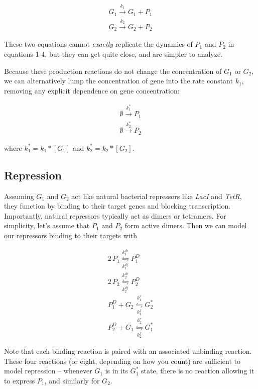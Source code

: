 \documentclass[preprint,12pt]{elsarticle}
\begin{document}
\begin{align}
	G_1 \xrightarrow{k_1} G_1 + P_1\\
	G_2 \xrightarrow{k_2} G_2 + P_2
\end{align}

These two equations cannot \emph{exactly} replicate the dynamics of $P_1$ and $P_2$ in equations 1-4, but they can get quite close, and are simpler to analyze. 

Because these production reactions do not change the concentration of $G_1$ or $G_2$, we can alternatively lump the concentration of gene into the rate constant $k_1$, removing any explicit dependence on gene concentration:

\begin{align}
	\emptyset \xrightarrow{k_1^*} P_1\\
	\emptyset \xrightarrow{k_2^*} P_2
\end{align}

where $k_1^* = k_1*[G_1]$ and $k_2^* = k_2*[G_2]$.

\subsection{Repression}\label{ss:repression}

Assuming $G_1$ and $G_2$ act like natural bacterial repressors like \emph{LacI} and \emph{TetR}, they function by binding to their target genes and blocking transcription. Importantly, natural repressors typically act as dimers or tetramers. For simplicity, let's assume that $P_1$ and $P_2$ form active dimers. Then we can model our repressors binding to their targets with 

\begin{align}
	2\,P_1 \underset{k^{df}_1}{\overset{k^{dr}_1}{\leftrightharpoons}} P_1^D\\
	2\,P_2 \underset{k^{df}_2}{\overset{k^{dr}_2}{\leftrightharpoons}} P_2^D\\
	P_1^D + G_2 \underset{k_1^f}{\overset{k_1^r}{\leftrightharpoons}} G_2^*\\
	P_2^D + G_1 \underset{k_2^f}{\overset{k_2^r}{\leftrightharpoons}} G_1^*
\end{align}

Note that each binding reaction is paired with an associated unbinding reaction. These four reactions (or eight, depending on how you count) are sufficient to model repression -- whenever $G_1$ is in its $G_1^*$ state, there is no reaction allowing it to express $P_1$, and similarly for $G_2$. 
\end{document}
